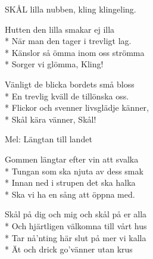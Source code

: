 \begin{SongText}
\begin{SongVerse}
        SKÅL lilla nubben, kling klingeling.
    \end{SongVerse}
    \begin{SongVerse}
        Hutten den lilla smakar ej illa\\*%
        När man den tager i trevligt lag.\\*%
        Känslor så ömma inom oss strömma\\*%
        Sorger vi glömma, Kling!
    \end{SongVerse}
    \begin{SongVerse}
        Vänligt de blicka bordets små bloss\\*%
        En trevlig kväll de tillönska oss.\\*%
        Flickor och svenner livsglädje känner,\\*%
        Skål kära vänner, Skål!
    \end{SongVerse}
\end{SongText}
\begin{SongText}
    \begin{SongInfo}
        Mel: Längtan till landet
    \end{SongInfo}
    \begin{SongVerse}
        Gommen längtar efter vin att svalka\\*%
        Tungan som ska njuta av dess smak\\*%
        Innan ned i strupen det ska halka\\*%
        Ska vi ha en sång att öppna med.
    \end{SongVerse}
    \begin{SongVerse}
        Skål på dig och mig och skål på er alla\\*%
        Och hjärtligen välkomna till vårt hus\\*%
        Tar nå’nting här slut på mer vi kalla\\*%
        Ät och drick go’vänner utan krus
    \end{SongVerse}
\end{SongText}
\newpage
